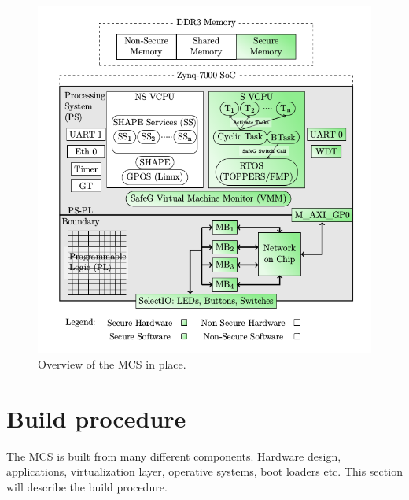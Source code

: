 \begin{figure}[H]
\centering
\includegraphics[width=\textwidth]{./img/literature_overview.png}
\caption{Overview of the MCS in place.\cite{zaki2016}}\label{fig:system_overview}
\end{figure}

\section{Build procedure}
The MCS is built from many different components. Hardware design,  applications, virtualization layer, operative systems, boot loaders etc. This section will describe the build procedure.\\ %

